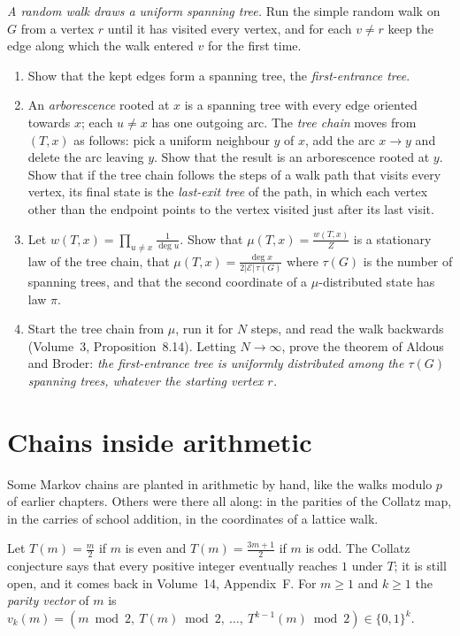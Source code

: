 \begin{exercise}[Journey]\label{pb:aldousbroder}
\emph{A random walk draws a uniform spanning tree.} Run the simple random walk on $G$ from a vertex $r$ until it has visited every vertex,
and for each $v\ne r$ keep the edge along which the walk entered $v$ for the first time.
\begin{enumerate}[label=(\alph*)]
\item Show that the kept edges form a spanning tree, the \emph{first-entrance tree}.
\item An \emph{arborescence} rooted at $x$ is a spanning tree with every edge oriented towards $x$; each $u\ne x$ has one outgoing arc. The \emph{tree chain}
moves from $(T,x)$ as follows: pick a uniform neighbour $y$ of $x$, add the arc $x\to y$ and delete the arc leaving $y$. Show that the result is an
arborescence rooted at $y$. Show that if the tree chain follows the steps of a walk path that visits every vertex, its final state is the
\emph{last-exit tree} of the path, in which each vertex other than the endpoint points to the vertex visited just after its last visit.
\item Let $w(T,x)=\prod_{u\ne x}\frac1{\deg u}$. Show that $\mu(T,x)=\frac{w(T,x)}Z$ is a stationary law of the tree chain, that $\mu(T,x)=\frac{\deg x}{2|\mathcal E|\,\tau(G)}$ where $\tau(G)$
is the number of spanning trees, and that the second coordinate of a $\mu$-distributed state has law $\pi$.
\item Start the tree chain from $\mu$, run it for $N$ steps, and read the walk backwards (Volume~3, Proposition~8.14). Letting $N\to\infty$, prove the
theorem of Aldous and Broder: \emph{the first-entrance tree is uniformly distributed among the $\tau(G)$ spanning trees, whatever the starting
vertex $r$.}
\end{enumerate}
\end{exercise}

\section{Chains inside arithmetic}

Some Markov chains are planted in arithmetic by hand, like the walks modulo $p$ of earlier chapters. Others were there all along: in
the parities of the Collatz map, in the carries of school addition, in the coordinates of a lattice walk.

Let $T(m)=\frac m2$ if $m$ is even and $T(m)=\frac{3m+1}2$ if $m$ is odd. The Collatz conjecture says that every positive integer
eventually reaches $1$ under $T$; it is still open, and it comes back in Volume~14, Appendix~F. For $m\ge1$ and $k\ge1$ the
\emph{parity vector} of $m$ is $v_k(m)=(m\bmod2,\ T(m)\bmod2,\ \dots,\ T^{k-1}(m)\bmod2)\in\{0,1\}^k$.

